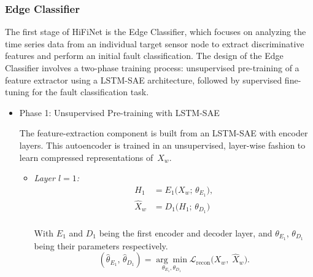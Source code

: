 \subsubsection{Edge Classifier}
The first stage of HiFiNet is the Edge Classifier, which focuses on analyzing the time series data from an individual target sensor node to extract discriminative features and perform an initial fault classification. The design of the Edge Classifier involves a two-phase training process: unsupervised pre-training of a feature extractor using a LSTM-SAE architecture, followed by supervised fine-tuning for the fault classification task.
\begin{itemize}
  \item Phase 1: Unsupervised Pre-training with LSTM-SAE 

  The feature-extraction component is built from an LSTM-SAE with encoder layers. This autoencoder is trained in an unsupervised, layer-wise fashion to learn compressed representations of~\(X_w\).

  \begin{itemize}
    \item \emph{Layer \(l=1\):}
      \[
        \begin{aligned}
          H_1 &= E_1\bigl(X_w;\,\theta_{E_1}\bigr), \\
          \hat X_w &= D_1\bigl(H_1;\,\theta_{D_1}\bigr) \\
        \end{aligned}
      \]

      With \(E_1\) and \(D_1\) being the first encoder and decoder layer, and \(\theta_{E_1}\), \(\theta_{D_1}\) being their parameters respectively.
      \[(\hat\theta_{E_1},\,\hat\theta_{D_1}) = \underset{\theta_{E_1}, \theta_{D_1}} {\arg\min} \mathcal L_{\mathrm{recon}}\bigl(X_w,\;\hat X_w\bigr).\]
  \end{itemize}
\end{itemize}
